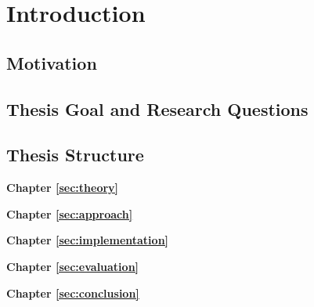 %
\chapter{Introduction}
\label{sec:intro}


\section{Motivation}
\label{sec:intro:motivation}

\blindtext

\section{Thesis Goal and Research Questions}
\label{sec:intro:goal}

\blindtext

\section{Thesis Structure}
\label{sec:intro:structure}

\textbf{Chapter \ref{sec:theory}} \\[0.2em]
\blindtext

\textbf{Chapter \ref{sec:approach}} \\[0.2em]
\blindtext

\textbf{Chapter \ref{sec:implementation}} \\[0.2em]
\blindtext

\textbf{Chapter \ref{sec:evaluation}} \\[0.2em]
\blindtext

\textbf{Chapter \ref{sec:conclusion}} \\[0.2em]
\blindtext
